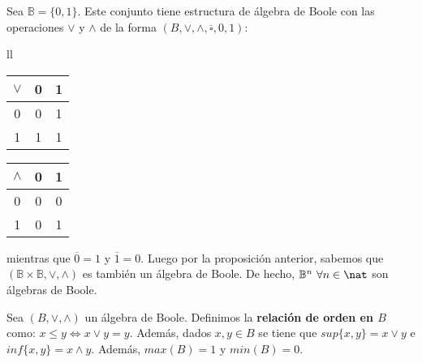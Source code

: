 \begin{ejemplo}
    Sea $\mathbb{B} = \{ 0,1 \}$. Este conjunto tiene estructura de álgebra de Boole con las operaciones $\lor$ y $\land$ de la forma $(B, \lor, \land, \overline{\square}, 0, 1)$: \\
    \begin{center}
        \begin{tabular}{ll}
            \begin{tabular}{ |c||c|c|  }
                \hline
                $\lor$ & 0 & 1 \\
                \hline
                0      & 0 & 1 \\
                \hline
                1      & 1 & 1 \\
                \hline
            \end{tabular}
            \quad
            \begin{tabular}{ |c||c|c|  }
                \hline
                $\land$ & 0 & 1 \\
                \hline
                0       & 0 & 0 \\
                \hline
                1       & 0 & 1 \\
                \hline
            \end{tabular}
        \end{tabular}
    \end{center}
    mientras que $\overline{0} = 1$ y $\overline{1} = 0$. Luego por la proposición anterior, sabemos que $(\mathbb{B} \times \mathbb{B}, \lor, \land)$ es también un álgebra de Boole.
    De hecho, $\mathbb{B}^n \ \forall n \in \nat$ son álgebras de Boole.
\end{ejemplo}

\begin{nth}[Orden]
    Sea $(B, \lor, \land)$ un álgebra de Boole. Definimos la \textbf{relación de orden en $B$} como: $x \leq y \Longleftrightarrow x \lor y = y$. Además, dados $x,y \in B$ se tiene que
    $sup\{x,y\} = x \lor y$ e $inf\{x,y\} = x \land y$. Además, $max(B) = 1$ y $min(B) = 0$.
\end{nth}

